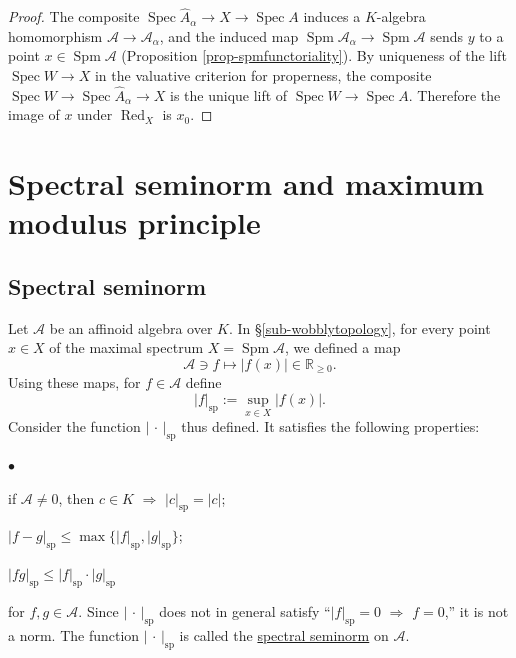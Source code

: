 \documentclass[a4paper,12pt, dvipdfmx]{jsbook}
\def\R{\mathbb{R}}
\def\Red{\mathop{\mathrm{Red}}\nolimits}
\def\sp{\mathop{\mathrm{sp}}\nolimits}
\def\Spec{\mathop{\mathrm{Spec}}\nolimits}
\def\Spm{\mathop{\mathrm{Spm}}\nolimits}
\newcommand{\abs}[1]{\lvert#1\rvert}
\renewenvironment{itemize}%
{%
   \begin{list}{\parbox{1zw}{$\bullet$}}%
   {%
      \setlength{\topsep}{.5zh}
      \setlength{\itemindent}{0zw}
      \setlength{\leftmargin}{3zw}%
      \setlength{\rightmargin}{0zw}%
      \setlength{\labelsep}{.5zw}%
      \setlength{\labelwidth}{3zw}%
      \setlength{\itemsep}{0.2em}%
      \setlength{\parsep}{0em}%
      \setlength{\listparindent}{0zw}%
   }
}{%
   \end{list}%
}
\theoremstyle{plain}
\theoremstyle{definition}
\begin{document}
\begin{proof}[Proof]
The composite $\Spec\widehat{A}_{\alpha}\rightarrow X\rightarrow\Spec A$ induces a $K$-algebra homomorphism $\mathcal{A}\rightarrow\mathcal{A}_{\alpha}$, and the induced map $\Spm\mathcal{A}_{\alpha}\rightarrow\Spm\mathcal{A}$ sends $y$ to a point $x\in\Spm\mathcal{A}$ (Proposition \ref{prop-spmfunctoriality}).
By uniqueness of the lift $\Spec W\rightarrow X$ in the valuative criterion for properness, the composite $\Spec W\rightarrow\Spec\widehat{A}_{\alpha}\rightarrow X$ is the unique lift of $\Spec W\rightarrow\Spec A$.
Therefore the image of $x$ under $\Red_X$ is $x_0$.
\end{proof}

\section{Spectral seminorm and maximum modulus principle}\label{sec-spectralseminorms}
\subsection{Spectral seminorm}\label{sub-spectralseminorms}
Let $\mathcal{A}$ be an affinoid algebra over $K$.
In \S\ref{sub-wobblytopology}, for every point $x\in X$ of the maximal spectrum $X=\Spm\mathcal{A}$, we defined a map
$$
\mathcal{A}\ni f\longmapsto\abs{f(x)}\in\R_{\geq 0}.
$$
Using these maps, for $f\in\mathcal{A}$ define
$$
\abs{f}_{\sp}:=\sup_{x\in X}\abs{f(x)}.
$$
Consider the function $\abs{\,\cdot\,}_{\sp}$ thus defined.
It satisfies the following properties:
\begin{itemize}
\item[(a)] if $\mathcal{A}\neq 0$, then $c\in K$ $\Rightarrow$ $\abs{c}_{\sp}=\abs{c}$;
\item[(b)] $\abs{f-g}_{\sp}\leq\max\{\abs{f}_{\sp},\abs{g}_{\sp}\}$;
\item[(c)] $\abs{fg}_{\sp}\leq\abs{f}_{\sp}\cdot\abs{g}_{\sp}$
\end{itemize}
for $f,g\in\mathcal{A}$.
Since $\abs{\,\cdot\,}_{\sp}$ does not in general satisfy ``$\abs{f}_{\sp}=0$ $\Rightarrow$ $f=0$,'' it is not a norm.
The function $\abs{\,\cdot\,}_{\sp}$ is called the \underline{spectral seminorm} on $\mathcal{A}$.
\end{document}
